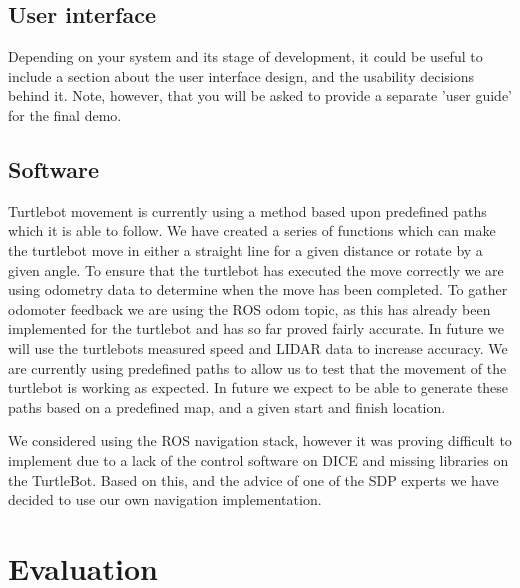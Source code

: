\documentclass{article}
\begin{document}
\subsection{User interface}

Depending on your system and its stage of development, it could be useful to include a section about the user interface design, and the usability decisions behind it. Note, however, that you will be asked to provide a separate 'user guide' for the final demo.

\subsection{Software}



Turtlebot movement is currently using a method based upon predefined paths which it is able to follow.
We have created a series of functions which can make the turtlebot move in either a straight line for a given distance or rotate by a given angle.
To ensure that the turtlebot has executed the move correctly we are using odometry data to determine when the move has been completed. 
To gather odomoter feedback we are using the ROS odom topic, as this has already been implemented for the turtlebot and has so far proved fairly accurate.
In future we will use the turtlebots measured speed and LIDAR data to increase accuracy.
We are currently using predefined paths to allow us to test that the movement of the turtlebot is working as expected. In future we expect to be able to generate these paths based on a predefined map, and a given start and finish location.

We considered using the ROS navigation stack, however it was proving difficult to implement due to a lack of the control software on DICE and missing libraries on the TurtleBot. 
Based on this, and the advice of one of the SDP experts we have decided to use our own navigation implementation.

\section{Evaluation}
\end{document}
